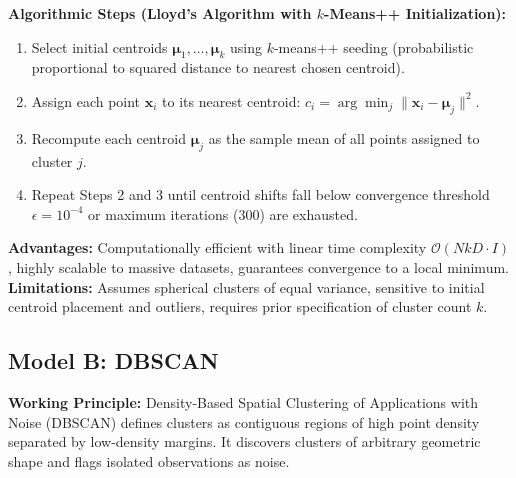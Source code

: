 \documentclass[12pt,a4paper]{article}
\begin{document}
\textbf{Algorithmic Steps (Lloyd's Algorithm with $k$-Means++ Initialization):}
\begin{enumerate}[noitemsep]
    \item Select initial centroids $\boldsymbol{\mu}_1, \dots, \boldsymbol{\mu}_k$ using $k$-means++ seeding (probabilistic proportional to squared distance to nearest chosen centroid).
    \item Assign each point $\mathbf{x}_i$ to its nearest centroid: $c_i = \arg\min_j \|\mathbf{x}_i - \boldsymbol{\mu}_j\|^2$.
    \item Recompute each centroid $\boldsymbol{\mu}_j$ as the sample mean of all points assigned to cluster $j$.
    \item Repeat Steps 2 and 3 until centroid shifts fall below convergence threshold $\epsilon = 10^{-4}$ or maximum iterations ($300$) are exhausted.
\end{enumerate}
\textbf{Advantages:} Computationally efficient with linear time complexity $\mathcal{O}(N k D \cdot I)$, highly scalable to massive datasets, guarantees convergence to a local minimum. \\
\textbf{Limitations:} Assumes spherical clusters of equal variance, sensitive to initial centroid placement and outliers, requires prior specification of cluster count $k$.

\subsection{Model B: DBSCAN}
\textbf{Working Principle:} Density-Based Spatial Clustering of Applications with Noise (DBSCAN) defines clusters as contiguous regions of high point density separated by low-density margins. It discovers clusters of arbitrary geometric shape and flags isolated observations as noise.
\end{document}
